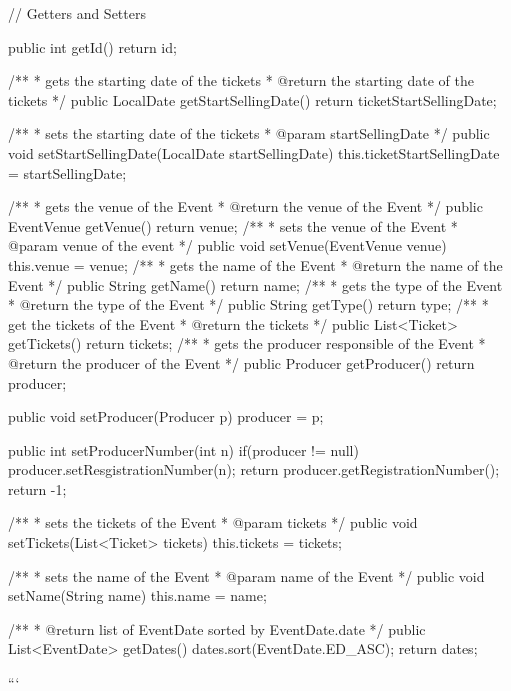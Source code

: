 \begin{prompt}
{{{{    
    // Getters and Setters
    
    public int getId() {
      return id;
    }
    
    /**
     * gets the starting date of the tickets
     * @return the starting date of the tickets
     */
    public LocalDate getStartSellingDate() {
      return ticketStartSellingDate;
    }
  
    /**
     * sets the starting date of the tickets
     * @param startSellingDate
     */
    public void setStartSellingDate(LocalDate startSellingDate) {
      this.ticketStartSellingDate = startSellingDate;
    }
    
    /**
     * gets the venue of the Event
     * @return the venue of the Event
     */
    public EventVenue getVenue() {
      return venue;
    }
    /**
     * sets the venue of the Event
     * @param venue of the event
     */
    public void setVenue(EventVenue venue) {
      this.venue = venue;
    }
    /**
     * gets the name of the Event
     * @return the name of the Event
     */
    public String getName() {
      return name;
    }
    /**
     * gets the type of the Event
     * @return the type of the Event
     */
    public String getType() {
      return type;
    }
    /**
     * get the tickets of the Event
     * @return the tickets
     */
    public List<Ticket> getTickets() {
      return tickets;
    }
    /**
     * gets the producer responsible of the Event
     * @return the producer of the Event
     */
    public Producer getProducer() {
      return producer;
    }
  
    public void setProducer(Producer p){
      producer = p;
    }
  
    public int setProducerNumber(int n){
      if(producer != null){
        producer.setResgistrationNumber(n);
        return producer.getRegistrationNumber();
      }
      return -1;
    }
    
    /**
     * sets the tickets of the Event
     * @param tickets
     */
    public void setTickets(List<Ticket> tickets) {
      this.tickets = tickets;
    }
    
    /**
     * sets the name of the Event
     * @param name of the Event
     */
    public void setName(String name) {
      this.name = name;
    }
  
    /**
     * @return list of EventDate sorted by EventDate.date
     */
    public List<EventDate> getDates() {
      dates.sort(EventDate.ED_ASC);
      return dates;
    }
  }
  ```
  
}}}
\end{prompt}
